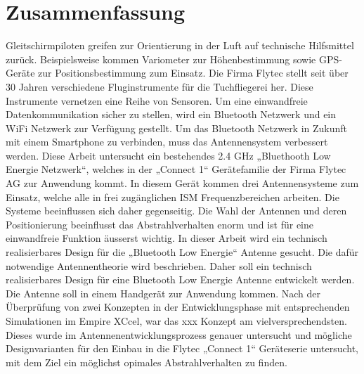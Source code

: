 \section*{Zusammenfassung}

Gleitschirmpiloten greifen zur Orientierung in der Luft auf technische Hilfsmittel zurück. Beispielsweise kommen Variometer zur Höhenbestimmung sowie GPS-Geräte zur Positionsbestimmung zum Einsatz. Die Firma Flytec stellt seit über 30 Jahren verschiedene Fluginstrumente für die Tuchfliegerei her. Diese Instrumente vernetzen eine Reihe von Sensoren. Um eine einwandfreie Datenkommunikation sicher zu stellen, wird ein Bluetooth Netzwerk und ein WiFi Netzwerk zur Verfügung gestellt. Um das Bluetooth Netzwerk in Zukunft mit einem Smartphone zu verbinden, muss das Antennensystem verbessert werden.
Diese Arbeit untersucht ein bestehendes 2.4 GHz „Bluethooth Low Energie Netzwerk“, welches in der „Connect 1“ Gerätefamilie der Firma Flytec AG zur Anwendung kommt. In diesem  Gerät kommen drei Antennensysteme zum Einsatz, welche alle in frei zugänglichen ISM Frequenzbereichen arbeiten. Die Systeme beeinflussen sich daher gegenseitig. Die Wahl der Antennen und deren Positionierung beeinflusst das Abstrahlverhalten enorm und ist für eine einwandfreie Funktion äusserst wichtig. In dieser Arbeit wird ein technisch realisierbares Design für die „Bluetooth Low Energie“ Antenne gesucht. Die dafür notwendige Antennentheorie wird beschrieben. Daher soll ein technisch realisierbares Design für eine Bluetooth Low Energie Antenne entwickelt werden. Die Antenne soll in einem Handgerät zur Anwendung kommen. Nach der Überprüfung von zwei Konzepten in der Entwicklungsphase mit entsprechenden Simulationen im Empire XCcel, war das xxx Konzept am vielversprechendsten. Dieses wurde im Antennenentwicklungsprozess genauer untersucht und mögliche Designvarianten für den Einbau in die Flytec „Connect 1“ Geräteserie untersucht, mit dem Ziel ein möglichst opimales Abstrahlverhalten zu finden.

